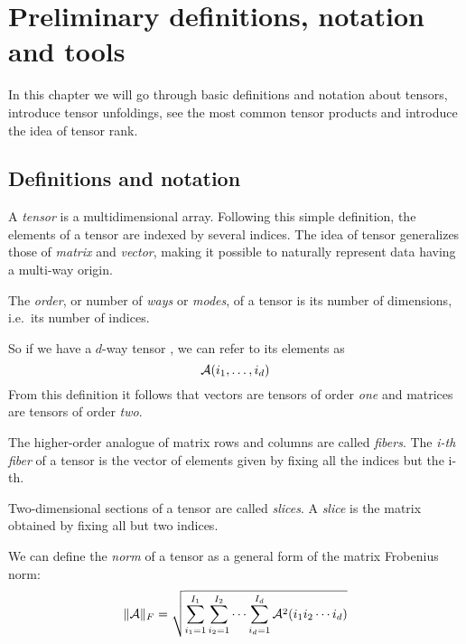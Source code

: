 \chapter{Preliminary definitions, notation and tools}

In this chapter we will go through basic definitions and notation about tensors, introduce tensor unfoldings, see the most common tensor products and introduce the idea of tensor rank.

\section{Definitions and notation}

A \emph{tensor} is a multidimensional array. Following this simple definition, the elements of a tensor are indexed by several indices.
The idea of tensor generalizes those of \emph{matrix} and \emph{vector}, making it possible to naturally represent data having a multi-way origin.

\begin{Def}
  The \emph{order}, or number of \emph{ways} or \emph{modes}, of a tensor is its number of dimensions, i.e.\ its number of indices.
\end{Def}
So if we have a $d$-way tensor \A, we can refer to its elements as
\begin{equation*}
  \mathcal{A}(i_1,\ldots,i_d)
\end{equation*}
From this definition it follows that vectors are tensors of order \emph{one} and matrices are tensors of order \emph{two}.

\begin{Def}
  The higher-order analogue of matrix rows and columns are called \emph{fibers}. The \emph{i-th fiber} of a tensor \A is the vector of elements given by fixing all the indices but the i-th.
\end{Def}

\begin{Def}
  Two-dimensional sections of a tensor are called \emph{slices}. A \emph{slice} is the matrix obtained by fixing all but two indices.
\end{Def}

\begin{Def}
  We can define the \emph{norm} of a tensor as a general form of the matrix Frobenius norm:
  \[
  \|\mathcal{A}\|_F = \sqrt{\sum_{i_1 = 1}^{I_1}\sum_{i_2 = 1}^{I_2}\cdots\sum_{i_d = 1}^{I_d}\mathcal{A}^2(i_1 i_2 \cdots i_d)}
  \]
\end{Def}

